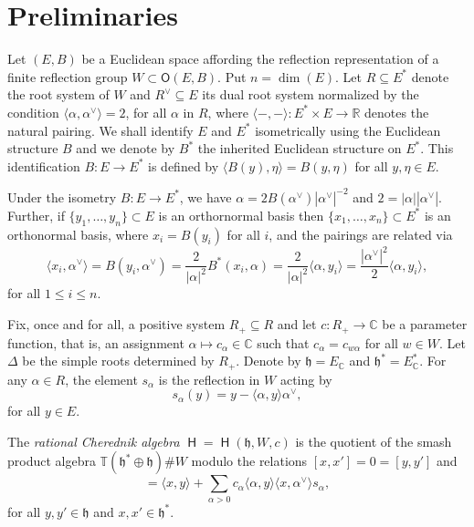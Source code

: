 \documentclass[10pt,a4paper]{amsart}
\numberwithin{equation}{section}
\newcommand{\fh}{\mathfrak{h}}
\newcommand{\bbc}{\mathbb{C}}
\newcommand{\bbr}{\mathbb{R}}
\newcommand{\bbt}{\mathbb{T}}
\DeclareMathOperator{\rca}{\mathsf{H}}
\begin{document}
\section{Preliminaries}\label{s:Prelims}

Let $(E,B)$ be a Euclidean space affording the reflection representation of a finite reflection group $W\subset \mathsf{O}(E,B)$. Put $n = \dim(E)$. Let $R\subseteq E^*$ denote the root system of $W$ and $R^\vee\subseteq E$ its dual root system normalized by the condition $\langle \alpha,\alpha^\vee \rangle = 2$, for all $\alpha$ in $R$, where $\langle -,- \rangle\colon E^*\times E \to \bbr$ denotes the natural pairing. We shall identify $E$ and $E^*$ isometrically using the Euclidean structure $B$ and we denote by $B^*$ the inherited Euclidean structure on $E^*$. This identification $B\colon E \to E^*$ is defined by $\langle B(y),\eta \rangle = B(y,\eta)$ for all $y,\eta\in E$.
\begin{Remark}
Under the isometry $B\colon E \to E^*$, we have
$\alpha = 2B(\alpha^\vee)|\alpha^\vee|^{-2}$ and $2=|\alpha||\alpha^\vee|$. Further, if $\{y_1,\dots,y_n\}\subset E$ is an orthornormal basis then $\{x_1,\dots,x_n\}\subset E^*$ is an orthonormal basis, where $x_i = B(y_i)$ for all $i$, and the pairings are related via
\begin{equation}\label{e:pairings}
\langle x_i,\alpha^\vee \rangle = B(y_i,\alpha^\vee)
= \frac{2}{|\alpha|^2} B^*(x_i,\alpha)
= \frac{2}{|\alpha|^2}\langle \alpha,y_i \rangle
= \frac{|\alpha^\vee|^2}{2}\langle \alpha,y_i \rangle,
\end{equation}
for all $1\leq i \leq n$.
\end{Remark}
Fix, once and for all, a positive system $R_+\subseteq R$ and let $c\colon R_+\to \bbc$ be a parameter function, that is, an assignment $\alpha \mapsto c_\alpha \in \bbc$ such that $c_\alpha = c_{w\alpha}$ for all $w \in W$. Let $\Delta$ be the simple roots determined by $R_+$. Denote by $\fh = E_\bbc$ and $\fh^* = E^*_\bbc$. For any $\alpha \in R$, the element $s_\alpha$ is the reflection in $W$ acting by
\[ s_\alpha(y) = y - \langle \alpha , y \rangle \alpha^\vee,
\]
for all $y \in E$.

\begin{Definition}[\cite{EG02}] \label{d:RCA}
The {\it rational Cherednik algebra} $\rca = \rca(\fh,W,c)$ is the quotient of the smash product algebra $\bbt(\fh^*\oplus\fh)\#W$ modulo the relations $[x,x']=0=[y,y']$ and
\begin{equation*}%
[y,x] = \langle x,y \rangle + \sum_{\alpha>0} c_\alpha \langle \alpha,y\rangle \langle x, \alpha^\vee \rangle s_\alpha,
\end{equation*}
for all $y,y'\in \fh$ and $x,x' \in \fh^*$.
\end{Definition}
\end{document}
